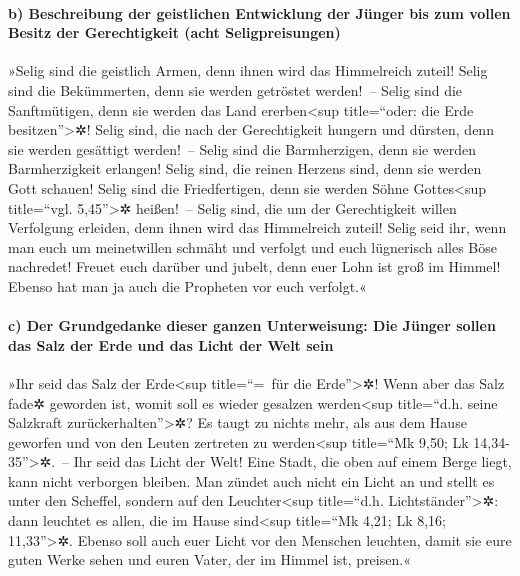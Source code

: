 \hypertarget{b-beschreibung-der-geistlichen-entwicklung-der-juxfcnger-bis-zum-vollen-besitz-der-gerechtigkeit-acht-seligpreisungen}{%
\paragraph{b) Beschreibung der geistlichen Entwicklung der Jünger bis
zum vollen Besitz der Gerechtigkeit (acht
Seligpreisungen)}\label{b-beschreibung-der-geistlichen-entwicklung-der-juxfcnger-bis-zum-vollen-besitz-der-gerechtigkeit-acht-seligpreisungen}}

 »Selig sind die geistlich Armen, denn ihnen wird das
Himmelreich zuteil!  Selig sind die Bekümmerten, denn sie
werden getröstet werden!~--  Selig sind die Sanftmütigen,
denn sie werden das Land ererben\textless sup title=``oder: die Erde
besitzen''\textgreater✲!  Selig sind, die nach der
Gerechtigkeit hungern und dürsten, denn sie werden gesättigt werden!~--
 Selig sind die Barmherzigen, denn sie werden
Barmherzigkeit erlangen!  Selig sind, die reinen Herzens
sind, denn sie werden Gott schauen!  Selig sind die
Friedfertigen, denn sie werden Söhne Gottes\textless sup title=``vgl.
5,45''\textgreater✲ heißen!~--  Selig sind, die um der
Gerechtigkeit willen Verfolgung erleiden, denn ihnen wird das
Himmelreich zuteil!  Selig seid ihr, wenn man euch um
meinetwillen schmäht und verfolgt und euch lügnerisch alles Böse
nachredet!  Freuet euch darüber und jubelt, denn euer
Lohn ist groß im Himmel! Ebenso hat man ja auch die Propheten vor euch
verfolgt.«

\hypertarget{c-der-grundgedanke-dieser-ganzen-unterweisung-die-juxfcnger-sollen-das-salz-der-erde-und-das-licht-der-welt-sein}{%
\paragraph{c) Der Grundgedanke dieser ganzen Unterweisung: Die Jünger
sollen das Salz der Erde und das Licht der Welt
sein}\label{c-der-grundgedanke-dieser-ganzen-unterweisung-die-juxfcnger-sollen-das-salz-der-erde-und-das-licht-der-welt-sein}}

 »Ihr seid das Salz der Erde\textless sup title=``=~für
die Erde''\textgreater✲! Wenn aber das Salz fade✲ geworden ist, womit
soll es wieder gesalzen werden\textless sup title=``d.h. seine Salzkraft
zurückerhalten''\textgreater✲? Es taugt zu nichts mehr, als aus dem
Hause geworfen und von den Leuten zertreten zu werden\textless sup
title=``Mk 9,50; Lk 14,34-35''\textgreater✲.~--  Ihr seid
das Licht der Welt! Eine Stadt, die oben auf einem Berge liegt, kann
nicht verborgen bleiben.  Man zündet auch nicht ein Licht
an und stellt es unter den Scheffel, sondern auf den
Leuchter\textless sup title=``d.h. Lichtständer''\textgreater✲: dann
leuchtet es allen, die im Hause sind\textless sup title=``Mk 4,21; Lk
8,16; 11,33''\textgreater✲.  Ebenso soll auch euer Licht
vor den Menschen leuchten, damit sie eure guten Werke sehen und euren
Vater, der im Himmel ist, preisen.«

